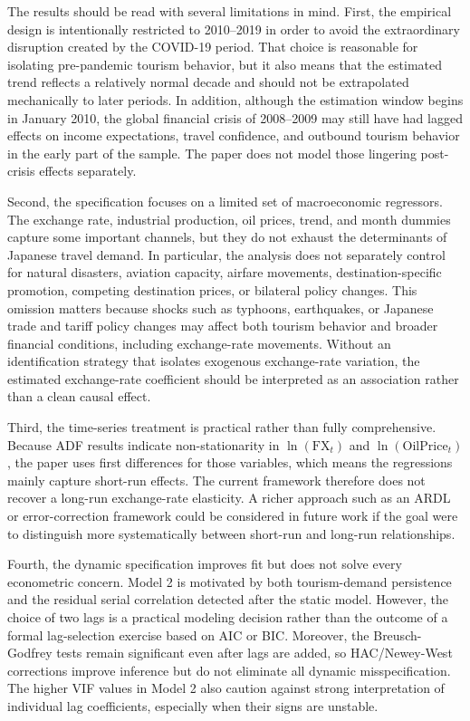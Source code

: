 \documentclass[12pt]{article}
\begin{document}
The results should be read with several limitations in mind. First, the empirical design is intentionally restricted to 2010--2019 in order to avoid the extraordinary disruption created by the COVID-19 period. That choice is reasonable for isolating pre-pandemic tourism behavior, but it also means that the estimated trend reflects a relatively normal decade and should not be extrapolated mechanically to later periods. In addition, although the estimation window begins in January 2010, the global financial crisis of 2008--2009 may still have had lagged effects on income expectations, travel confidence, and outbound tourism behavior in the early part of the sample. The paper does not model those lingering post-crisis effects separately.

Second, the specification focuses on a limited set of macroeconomic regressors. The exchange rate, industrial production, oil prices, trend, and month dummies capture some important channels, but they do not exhaust the determinants of Japanese travel demand. In particular, the analysis does not separately control for natural disasters, aviation capacity, airfare movements, destination-specific promotion, competing destination prices, or bilateral policy changes. This omission matters because shocks such as typhoons, earthquakes, or Japanese trade and tariff policy changes may affect both tourism behavior and broader financial conditions, including exchange-rate movements. Without an identification strategy that isolates exogenous exchange-rate variation, the estimated exchange-rate coefficient should be interpreted as an association rather than a clean causal effect.

Third, the time-series treatment is practical rather than fully comprehensive. Because ADF results indicate non-stationarity in $\ln(\mathrm{FX}_t)$ and $\ln(\mathrm{OilPrice}_t)$, the paper uses first differences for those variables, which means the regressions mainly capture short-run effects. The current framework therefore does not recover a long-run exchange-rate elasticity. A richer approach such as an ARDL or error-correction framework could be considered in future work if the goal were to distinguish more systematically between short-run and long-run relationships.

Fourth, the dynamic specification improves fit but does not solve every econometric concern. Model 2 is motivated by both tourism-demand persistence and the residual serial correlation detected after the static model. However, the choice of two lags is a practical modeling decision rather than the outcome of a formal lag-selection exercise based on AIC or BIC. Moreover, the Breusch-Godfrey tests remain significant even after lags are added, so HAC/Newey-West corrections improve inference but do not eliminate all dynamic misspecification. The higher VIF values in Model 2 also caution against strong interpretation of individual lag coefficients, especially when their signs are unstable.
\end{document}
